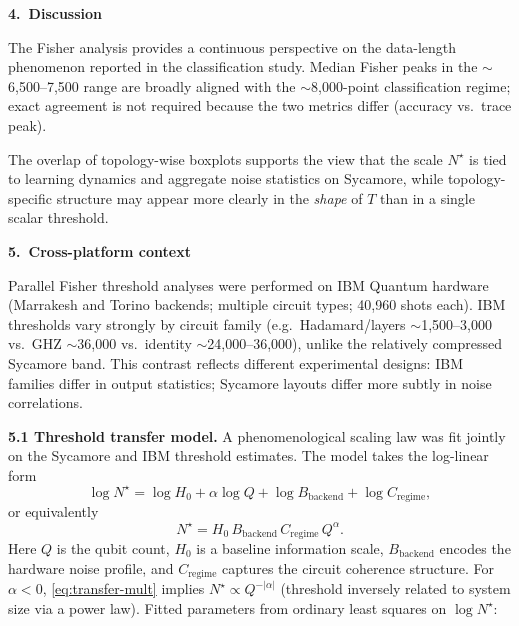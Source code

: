 \documentclass[11pt,a4paper]{article}
\begin{document}
\vspace{0.5em}
\textbf{4.\ Discussion}

The Fisher analysis provides a continuous perspective on the data-length phenomenon reported in the classification study. Median Fisher peaks in the $\sim$6{,}500--7{,}500 range are broadly aligned with the $\sim$8{,}000-point classification regime; exact agreement is not required because the two metrics differ (accuracy vs.\ trace peak).

The overlap of topology-wise boxplots supports the view that the scale $N^\star$ is tied to learning dynamics and aggregate noise statistics on Sycamore, while topology-specific structure may appear more clearly in the \emph{shape} of $T$ than in a single scalar threshold.

\vspace{0.5em}
\textbf{5.\ Cross-platform context}

Parallel Fisher threshold analyses were performed on IBM Quantum hardware (Marrakesh and Torino backends; multiple circuit types; 40{,}960 shots each). IBM thresholds vary strongly by circuit family (e.g.\ Hadamard/layers $\sim$1{,}500--3{,}000 vs.\ GHZ $\sim$36{,}000 vs.\ identity $\sim$24{,}000--36{,}000), unlike the relatively compressed Sycamore band. This contrast reflects different experimental designs: IBM families differ in output statistics; Sycamore layouts differ more subtly in noise correlations.

\textbf{5.1 Threshold transfer model.} A phenomenological scaling law was fit jointly on the Sycamore and IBM threshold estimates. The model takes the log-linear form
\begin{equation}
\label{eq:transfer-log}
\log N^\star = \log H_0 + \alpha\log Q + \log B_{\mathrm{backend}} + \log C_{\mathrm{regime}},
\end{equation}
or equivalently
\begin{equation}
\label{eq:transfer-mult}
N^\star = H_0\, B_{\mathrm{backend}}\, C_{\mathrm{regime}}\, Q^{\alpha}.
\end{equation}
Here $Q$ is the qubit count, $H_0$ is a baseline information scale, $B_{\mathrm{backend}}$ encodes the hardware noise profile, and $C_{\mathrm{regime}}$ captures the circuit coherence structure. For $\alpha<0$, \eqref{eq:transfer-mult} implies $N^\star \propto Q^{-|\alpha|}$ (threshold inversely related to system size via a power law). Fitted parameters from ordinary least squares on $\log N^\star$:
\end{document}
